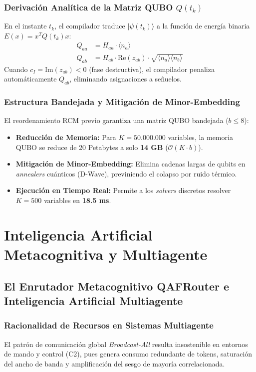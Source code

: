 \documentclass[11pt,a4paper,oneside]{report}
\begin{document}
\section{Derivación Analítica de la Matriz QUBO $Q(t_k)$}
En el instante $t_k$, el compilador traduce $|\psi(t_k)\rangle$ a la función de energía binaria $E(x) = x^T Q(t_k) x$:
\begin{align}
Q_{aa} &= H_{aa} \cdot \langle n_a \rangle \\
Q_{ab} &= H_{ab} \cdot \text{Re}(z_{ab}) \cdot \sqrt{\langle n_a \rangle \langle n_b \rangle}
\end{align}
Cuando $c_I = \text{Im}(z_{ab}) < 0$ (fase destructiva), el compilador penaliza automáticamente $Q_{ab}$, eliminando asignaciones a señuelos.

\section{Estructura Bandejada y Mitigación de Minor-Embedding}
El reordenamiento RCM previo garantiza una matriz QUBO bandejada ($b \le 8$):
\begin{itemize}
    \item \textbf{Reducción de Memoria:} Para $K = 50.000.000$ variables, la memoria QUBO se reduce de 20 Petabytes a solo \textbf{14 GB} ($\mathcal{O}(K \cdot b)$).
    \item \textbf{Mitigación de Minor-Embedding:} Elimina cadenas largas de qubits en \emph{annealers} cuánticos (D-Wave), previniendo el colapso por ruido térmico.
    \item \textbf{Ejecución en Tiempo Real:} Permite a los \emph{solvers} discretos resolver $K = 500$ variables en \textbf{18.5 ms}.
\end{itemize}


\part{Inteligencia Artificial Metacognitiva y Multiagente}

\chapter{El Enrutador Metacognitivo QAFRouter e Inteligencia Artificial Multiagente}
\label{cap:qaf_router}

\section{Racionalidad de Recursos en Sistemas Multiagente}
El patrón de comunicación global \emph{Broadcast-All} resulta insostenible en entornos de mando y control (C2), pues genera consumo redundante de tokens, saturación del ancho de banda y amplificación del sesgo de mayoría correlacionada.
\end{document}
